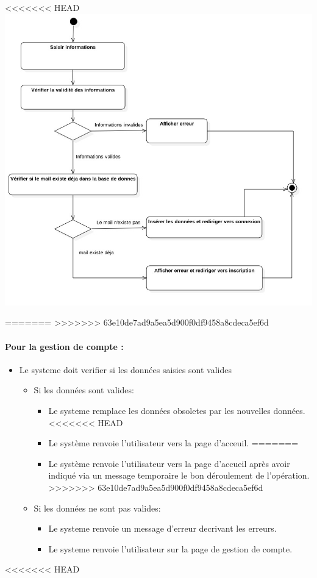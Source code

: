 \documentclass{article}
\begin{document}
\begin{itemize}
\begin{itemize}
<<<<<<< HEAD
\includegraphics[scale=0.5]{ShematDiagrammes/activiteInscription.jpg}

=======
>>>>>>> 63e10de7ad9a5ea5d900f0df9458a8cdeca5ef6d

\paragraph{Pour la gestion de compte : }
\begin{itemize}
\item Le systeme doit verifier si les données saisies sont valides
	\begin{itemize}
	\item Si les données sont valides:
		\begin{itemize}
		\item Le systeme remplace les données obsoletes par
                  les nouvelles données.
<<<<<<< HEAD
                \item Le système renvoie l'utilisateur vers la page d'acceuil.
=======
                \item Le système renvoie l'utilisateur vers la page d'accueil
                 après avoir indiqué via un message temporaire le bon déroulement de l'opération.
>>>>>>> 63e10de7ad9a5ea5d900f0df9458a8cdeca5ef6d
		\end{itemize}
		\item Si les données ne sont pas valides:
		\begin{itemize}
		\item Le systeme renvoie un message d'erreur decrivant
                  les erreurs.
                \item Le systeme renvoie l'utilisateur sur la page de
                  gestion de compte.
		\end{itemize}
	\end{itemize}
\end{itemize}
<<<<<<< HEAD


\end{itemize}
\end{itemize}
\end{document}
